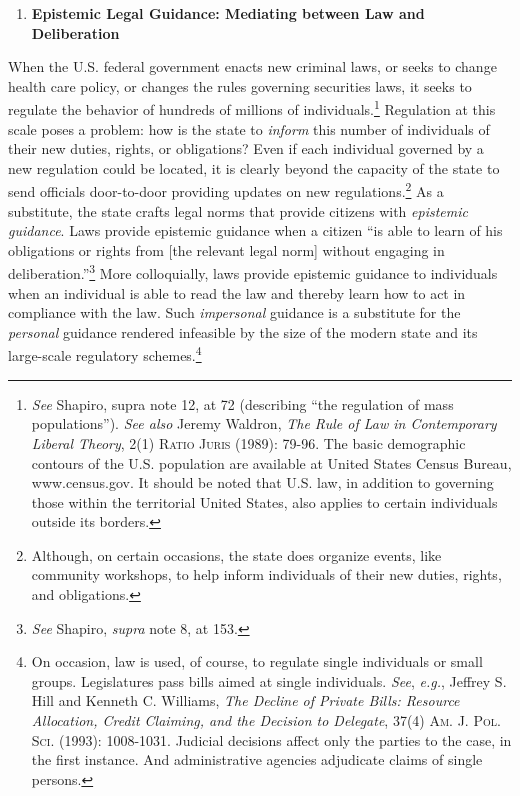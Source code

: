 \begin{enumerate}
\def\labelenumi{\arabic{enumi}.}
\item
  \textbf{Epistemic Legal Guidance: Mediating between Law and
  Deliberation}
\end{enumerate}

When the U.S. federal government enacts new criminal laws, or seeks to
change health care policy, or changes the rules governing securities
laws, it seeks to regulate the behavior of hundreds of millions of
individuals.\footnote{\emph{See} Shapiro, supra note 12, at 72
  (describing ``the regulation of mass populations''). \emph{See also}
  Jeremy Waldron, \emph{The Rule of Law in Contemporary Liberal Theory},
  2(1) \textsc{Ratio Juris} (1989): 79-96. The basic demographic
  contours of the U.S. population are available at United States Census
  Bureau, www.census.gov. It should be noted that U.S. law, in addition
  to governing those within the territorial United States, also applies
  to certain individuals outside its borders.} Regulation at this scale
poses a problem: how is the state to \emph{inform} this number of
individuals of their new duties, rights, or obligations? Even if each
individual governed by a new regulation could be located, it is clearly
beyond the capacity of the state to send officials door-to-door
providing updates on new regulations.\footnote{Although, on certain
  occasions, the state does organize events, like community workshops,
  to help inform individuals of their new duties, rights, and
  obligations.} As a substitute, the state crafts legal norms that
provide citizens with \emph{epistemic guidance}. Laws provide epistemic
guidance when a citizen ``is able to learn of his obligations or rights
from {[}the relevant legal norm{]} without engaging in
deliberation.''\footnote{\emph{See} Shapiro, \emph{supra} note 8, at
  153.} More colloquially, laws provide epistemic guidance to
individuals when an individual is able to read the law and thereby learn
how to act in compliance with the law. Such \emph{impersonal} guidance
is a substitute for the \emph{personal} guidance rendered infeasible by
the size of the modern state and its large-scale regulatory
schemes.\footnote{On occasion, law is used, of course, to regulate
  single individuals or small groups. Legislatures pass bills aimed at
  single individuals. \emph{See}, \emph{e.g.}, Jeffrey S. Hill and
  Kenneth C. Williams, \emph{The Decline of Private Bills: Resource
  Allocation, Credit Claiming, and the Decision to Delegate}, 37(4)
  \textsc{Am. J. Pol. Sci. (1993): 1008-1031.} Judicial decisions affect
  only the parties to the case, in the first instance. And
  administrative agencies adjudicate claims of single persons.}

